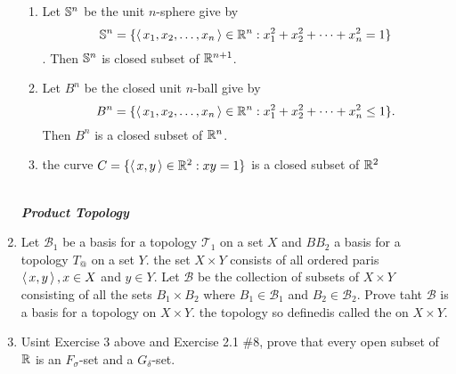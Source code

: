 \documentclass[10pt,a4paper]{report}
\newcommand{\SPECIAL}[1]{\begin{center}
	{\Large \textbf{\textit{\\#1}} }
\end{center}
}
\newcommand{\BB}{\mathcal{B}}
\newcommand{\TT}{\mathcal{T}}
\begin{document}
\begin{enumerate}
\begin{enumerate}[label=(\roman*)]
	\item Let $\mathbb{S}^n$ be the unit $n$-sphere give by \[ \mathbb{S}^n = \{\left \langle\, x_1,x_2,\dots,x_n \,\right \rangle \in \mathbb{R}^n : x_1^2+x_2^2+\cdots+x_n^2 = 1\}\].  Then $\mathbb{S}^n$ is closed subset of $\mathbb{R}^{n+1}$.
	
	\item Let $B^n$ be the closed unit $n$-ball give by \[ B^n = \{\left \langle\, x_1,x_2,\dots,x_n \,\right \rangle \in \mathbb{R}^n : x_1^2+x_2^2+\cdots+x_n^2 \le 1\}.\]  Then $B^n$ is a closed subset of $\mathbb{R}^n$.
	
	\item the curve $C = \{\left \langle\, x,y \,\right \rangle\in\mathbb{R}^2 : xy=1\}$ is a closed subset of $\mathbb{R}^2$

\end{enumerate}

\SPECIAL{Product Topology}
\item Let $\BB_1$ be a basis for a topology $\TT_1$ on a set $X$ and $BB_2$ a basis for a topology $T_@$ on a set $Y$.  the set $X \times Y$ consists of all ordered paris $\left \langle\, x,y \,\right \rangle, x \in X$ and $y \in Y$.  Let $\BB$ be the collection of subsets of $X \times Y$ consisting of all the sets $B_1 \times B_2$ where $B_1 \in \BB_1$ and $B_2 \in \BB_2$.  Prove taht $\BB$ is a basis for a topology on $X \times Y$.  the topology so definedis called the  on $X \times Y$.

\item Usint Exercise 3 above and Exercise 2.1 \#8, prove that every open subset of $\mathbb{R}$ is an $F_\sigma$-set and a $G_\delta$-set.
\end{enumerate} %
\end{document}
